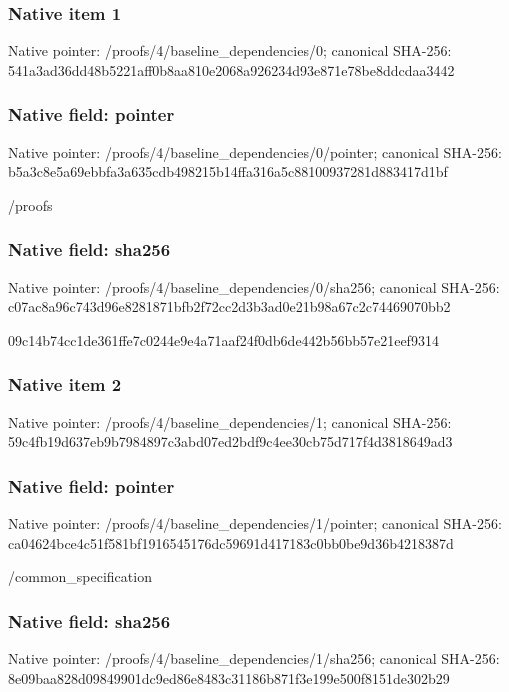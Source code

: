 \documentclass[10pt,a4paper]{article}
\begin{document}
\subsubsection{Native item 1}
Native pointer: /proofs/4/baseline\_\allowbreak{}dependencies/0; canonical SHA-256: 541a3ad36dd48b5221aff0b8aa810e2068a926234d93e871e78be8ddcdaa3442

\subsubsection{Native field: pointer}
Native pointer: /proofs/4/baseline\_\allowbreak{}dependencies/0/pointer; canonical SHA-256: b5a3c8e5a69ebbfa3a635cdb498215b14ffa316a5c88100937281d883417d1bf

\begingroup\raggedright\sloppy /\allowbreak{}proofs\par\endgroup

\subsubsection{Native field: sha256}
Native pointer: /proofs/4/baseline\_\allowbreak{}dependencies/0/sha256; canonical SHA-256: c07ac8a96c743d96e8281871bfb2f72cc2d3b3ad0e21b98a67c2c74469070bb2

\begingroup\raggedright\sloppy 09c14b74cc1de361ffe7c0244e9e4a71aaf24f0db6de442b56bb57e21eef9314\par\endgroup

\subsubsection{Native item 2}
Native pointer: /proofs/4/baseline\_\allowbreak{}dependencies/1; canonical SHA-256: 59c4fb19d637eb9b7984897c3abd07ed2bdf9c4ee30cb75d717f4d3818649ad3

\subsubsection{Native field: pointer}
Native pointer: /proofs/4/baseline\_\allowbreak{}dependencies/1/pointer; canonical SHA-256: ca04624bce4c51f581bf1916545176dc59691d417183c0bb0be9d36b4218387d

\begingroup\raggedright\sloppy /\allowbreak{}common\_\allowbreak{}specification\par\endgroup

\subsubsection{Native field: sha256}
Native pointer: /proofs/4/baseline\_\allowbreak{}dependencies/1/sha256; canonical SHA-256: 8e09baa828d09849901dc9ed86e8483c31186b871f3e199e500f8151de302b29
\end{document}
